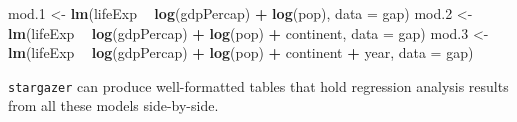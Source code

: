 \documentclass[]{book}
\newenvironment{Shaded}{\begin{snugshade}}{\end{snugshade}}
\newcommand{\KeywordTok}[1]{\textcolor[rgb]{0.13,0.29,0.53}{\textbf{#1}}}
\newcommand{\DataTypeTok}[1]{\textcolor[rgb]{0.13,0.29,0.53}{#1}}
\newcommand{\DecValTok}[1]{\textcolor[rgb]{0.00,0.00,0.81}{#1}}
\newcommand{\StringTok}[1]{\textcolor[rgb]{0.31,0.60,0.02}{#1}}
\newcommand{\OperatorTok}[1]{\textcolor[rgb]{0.81,0.36,0.00}{\textbf{#1}}}
\newcommand{\NormalTok}[1]{#1}
\begin{document}
\begin{Shaded}
\begin{Highlighting}[]
\NormalTok{mod.}\DecValTok{1}\NormalTok{ <-}\StringTok{ }\KeywordTok{lm}\NormalTok{(lifeExp }\OperatorTok{~}\StringTok{ }\KeywordTok{log}\NormalTok{(gdpPercap) }\OperatorTok{+}\StringTok{ }\KeywordTok{log}\NormalTok{(pop), }\DataTypeTok{data =}\NormalTok{ gap)}
\NormalTok{mod.}\DecValTok{2}\NormalTok{ <-}\StringTok{ }\KeywordTok{lm}\NormalTok{(lifeExp }\OperatorTok{~}\StringTok{ }\KeywordTok{log}\NormalTok{(gdpPercap) }\OperatorTok{+}\StringTok{ }\KeywordTok{log}\NormalTok{(pop) }\OperatorTok{+}\StringTok{ }\NormalTok{continent, }\DataTypeTok{data =}\NormalTok{ gap)}
\NormalTok{mod.}\DecValTok{3}\NormalTok{ <-}\StringTok{ }\KeywordTok{lm}\NormalTok{(lifeExp }\OperatorTok{~}\StringTok{ }\KeywordTok{log}\NormalTok{(gdpPercap) }\OperatorTok{+}\StringTok{ }\KeywordTok{log}\NormalTok{(pop) }\OperatorTok{+}\StringTok{ }\NormalTok{continent }\OperatorTok{+}\StringTok{ }\NormalTok{year, }\DataTypeTok{data =}\NormalTok{ gap)}
\end{Highlighting}
\end{Shaded}

\texttt{stargazer} can produce well-formatted tables that hold
regression analysis results from all these models side-by-side.
\end{document}
